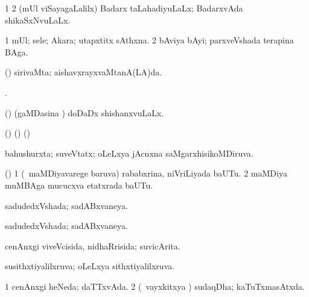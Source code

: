 {{{\bentry
{} 
\gl{\gu}
\expl{}
\bmng
\bnum
\num{1}  
\num{2} (mUl viSayagaLalilx) Badarx taLahadiyuLaLx; BadarxvAda shikaSxNvuLaLx. 
\enum
\emng
\eentry

\bentry
{} 
\gl{\nA}
\expl{}
\bmng
\bnum
\num{1} mUl; sele; Akara; utapxtitx sAthxna. 
\num{2} bAviya bAyi; parxveVshada terapina BAga. 
\enum
\emng
\eentry

\bentry
{} 
\gl{\gu}
\expl{}
\bmng
(\AmA) sirivaMta; aishavxrayxvaMtanA(LA)da. 
\emng
\eentry

\bentry
{} 
\bmng
{}. 
\emng
\eentry

\bentry
{} 
\gl{\gu}
\expl{}
\bmng
(\AmA) (gaMDasina \vi) doDaDx shishanxvuLaLx. 
\emng
\eentry

\bentry
{} 
\gl{\nA}
\expl{}
\bmng
(\bava) (\birx) (\AmA)  
\emng
\eentry

\bentry
{} 
\gl{\gu}
\expl{}
\bmng
bahushurxta; suveVtatx; oLeLxya jAcnxna saMgarxhisikoMDiruva. 
\emng
\eentry

\bentry
{} 
\gl{\nA}
\expl{}
\bmng
(\birx) 
\bnum
\num{1} (\sA\ maMDiyavarege baruva) rababxrina, niVriLiyada baUTu. 
\num{2} maMDiya muMBAga mucucxva etatxrada baUTu. 
\enum
\emng
\eentry

\bentry
{} 
\gl{\nA}
\expl{}
\bmng
{} 
\emng
\eentry

\bentry
{} 
\gl{\gu}
\expl{}
\bmng
sadudedxVshada; sadABxvaneya. 
\emng
\eentry

\bentry
{} 
\gl{\gu}
\expl{}
\bmng
sadudedxVshada; sadABxvaneya. 
\emng
\eentry

\bentry
{} 
\gl{\gu}
\expl{}
\bmng
cenAnxgi viveVcisida, nidhaRrisida; suvicArita. 
\emng
\eentry

\bentry
{} 
\gl{\gu}
\expl{}
\bmng
susithxtiyalilxruva; oLeLxya sithxtiyalilxruva. 
\emng
\eentry

\bentry
{} 
\gl{\gu}
\expl{}
\bmng
\bnum
\num{1} cenAnxgi heNeda; daTTxvAda. 
\num{2} (\kanmu\ vayxkitxya \vi) sudaqDha; kaTuTxmasAtxda. 
\enum
\emng
\eentry

}}}
